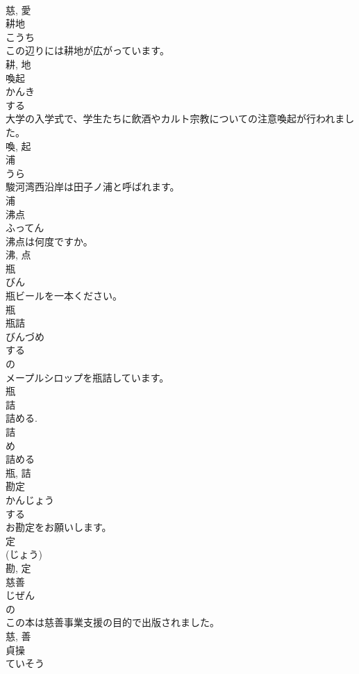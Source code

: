 \documentclass[8pt]{extreport}
\begin{document}
\begin{CJK}{UTF8}{min}
\\	慈, 愛	
\\	耕地	
\\	こうち	
\\	この辺りには耕地が広がっています。	
\\	耕, 地	
\\	喚起	
\\	かんき	
\\	する 
\\	大学の入学式で、学生たちに飲酒やカルト宗教についての注意喚起が行われました。	
\\	喚, 起	
\\	浦	
\\	うら	
\\	駿河湾西沿岸は田子ノ浦と呼ばれます。	
\\	浦	
\\	沸点	
\\	ふってん	
\\	沸点は何度ですか。	
\\	沸, 点	
\\	瓶	
\\	びん	
\\	瓶ビールを一本ください。	
\\	瓶	
\\	瓶詰	
\\	びんづめ	
\\	する 
\\	の 
\\	メープルシロップを瓶詰しています。	
\\	瓶 
\\	詰 
\\	詰める. 
\\	詰 
\\	め 
\\	詰める 
\\	瓶, 詰	
\\	勘定	
\\	かんじょう	
\\	する 
\\	お勘定をお願いします。	
\\	定 
\\	(じょう) 
\\	勘, 定	
\\	慈善	
\\	じぜん	
\\	の 
\\	この本は慈善事業支援の目的で出版されました。	
\\	慈, 善	
\\	貞操	
\\	ていそう	

\end{CJK}
\end{document}
